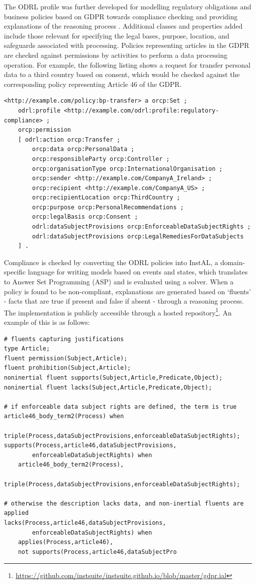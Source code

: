 The ODRL profile was further developed for modelling regulatory obligations and business policies based on GDPR towards compliance checking and providing explanations of the reasoning process \cite{vos_odrl_2019}. Additional classes and properties added include those relevant for specifying the legal bases, purpose, location, and safeguards associated with processing. Policies representing articles in the GDPR are checked against permissions by activities to perform a data processing operation. For example, the following listing shows a request for transfer personal data to a third country based on consent, which would be checked against the corresponding policy representing Article 46 of the GDPR. 
\begin{lstlisting}
<http://example.com/policy:bp-transfer> a orcp:Set ;
    odrl:profile <http://example.com/odrl:profile:regulatory-compliance> ;
    orcp:permission
    [ odrl:action orcp:Transfer ;
        orcp:data orcp:PersonalData ;
        orcp:responsibleParty orcp:Controller ;
        orcp:organisationType orcp:InternationalOrganisation ;
        orcp:sender <http://example.com/CompanyA_Ireland> ;
        orcp:recipient <http://example.com/CompanyA_US> ;
        orcp:recipientLocation orcp:ThirdCountry ;
        orcp:purpose orcp:PersonalRecommendations ;
        orcp:legalBasis orcp:Consent ;
        odrl:dataSubjectProvisions orcp:EnforceableDataSubjectRights ;
        odrl:dataSubjectProvisions orcp:LegalRemediesForDataSubjects
    ] .
\end{lstlisting}
Compliance is checked by converting the ODRL policies into InstAL, a domain-specific language for writing models based on events and states, which translates to Answer Set Programming (ASP) and is evaluated using a solver. When a policy is found to be non-compliant, explanations are generated based on `fluents' - facts that are true if present and false if absent - through a reasoning process. The implementation is publicly accessible through a hosted repository\footnote{\url{https://github.com/instsuite/instsuite.github.io/blob/master/gdpr.ial}}. An example of this is as follows:
\begin{lstlisting}
# fluents capturing justifications
type Article;
fluent permission(Subject,Article);
fluent prohibition(Subject,Article);
noninertial fluent supports(Subject,Article,Predicate,Object);
noninertial fluent lacks(Subject,Article,Predicate,Object);

# if enforceable data subject rights are defined, the term is true
article46_body_term2(Process) when
    triple(Process,dataSubjectProvisions,enforceableDataSubjectRights);
supports(Process,article46,dataSubjectProvisions,
        enforceableDataSubjectRights) when
    article46_body_term2(Process),
    triple(Process,dataSubjectProvisions,enforceableDataSubjectRights);

# otherwise the description lacks data, and non-inertial fluents are applied
lacks(Process,article46,dataSubjectProvisions,
        enforceableDataSubjectRights) when
    applies(Process,article46),
    not supports(Process,article46,dataSubjectPro
\end{lstlisting}

